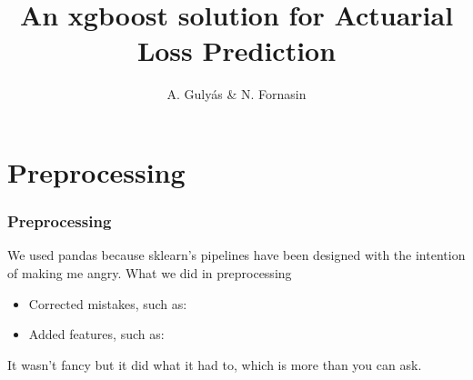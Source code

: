 \documentclass{beamer}
\title{An xgboost solution for Actuarial Loss Prediction} %
\author{A. Guly\'{a}s \& N. Fornasin} %
\institute[ALU] %
{
Team Boosted Goose\\ %
\medskip
}
\date{\quad} %
\begin{document}
\begin{frame}
\titlepage %
\end{frame}






\section{Preprocessing}
\begin{frame}
\frametitle{Preprocessing}
We used pandas because sklearn's pipelines have been designed with the intention of making me angry. What we did in preprocessing
\begin{itemize}
\item Corrected mistakes, such as:
\item Added features, such as:
\end{itemize}
It wasn't fancy but it did what it had to, which is more than you can ask.
\end{frame}
\end{document}
